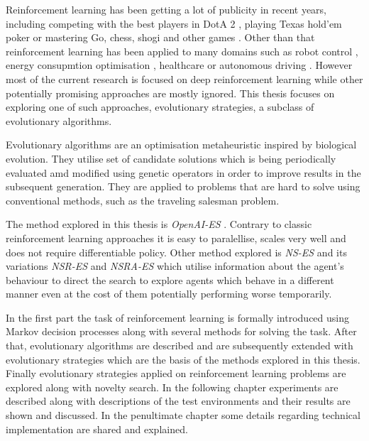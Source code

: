 


Reinforcement learning has been getting a lot of publicity in recent years, including competing with the best players in DotA 2 \cite{openai2019dota}, playing Texas hold'em poker \cite{Brown885} or mastering Go, chess, shogi and other games \cite{Schrittwieser2020}. Other than that reinforcement learning has been applied to many domains such as robot control \cite{openai2019solving}, energy consupmtion optimisation \cite{LISSA2021100043}, healthcare \cite{yu2020reinforcement} or autonomous driving \cite{kiran2021deep}. However most of the current research is focused on deep reinforcement learning while other potentially promising approaches are mostly ignored. This thesis focuses on exploring one of such approaches, evolutionary strategies, a subclass of evolutionary algorithms.

Evolutionary algorithms are an optimisation metaheuristic inspired by biological evolution. They utilise set of candidate solutions which is being periodically evaluated amd modified using genetic operators in order to improve results in the subsequent generation. They are applied to problems that are hard to solve using conventional methods, such as the traveling salesman problem. \cite{Potvin1996}

The method explored in this thesis is \emph{OpenAI-ES} \cite{salimans2017}. Contrary to classic reinforcement learning approaches it is easy to paralellise, scales very well and does not require differentiable policy. Other method explored is \emph{NS-ES} and its variations \emph{NSR-ES} and \emph{NSRA-ES} \cite{conti2018} which utilise information about the agent's behaviour to direct the search to explore agents which behave in a different manner even at the cost of them potentially performing worse temporarily.

In the first part the task of reinforcement learning is formally introduced using Markov decision processes along with several methods for solving the task. After that, evolutionary algorithms are described and are subsequently extended with evolutionary strategies which are the basis of the methods explored in this thesis. Finally evolutionary strategies applied on reinforcement learning problems are explored along with novelty search. In the following chapter experiments are described along with descriptions of the test environments and their results are shown and discussed. In the penultimate chapter some details regarding technical implementation are shared and explained.